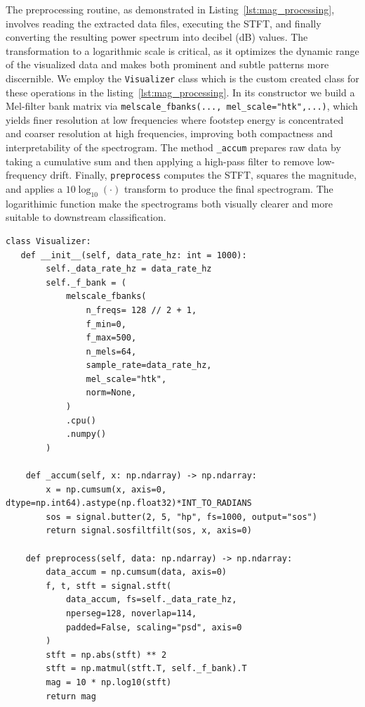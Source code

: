 The preprocessing routine, as demonstrated in Listing~\ref{lst:mag_processing}, involves reading the extracted data files, executing the STFT, and finally converting the resulting power spectrum into decibel (dB) values. The transformation to a logarithmic scale is critical, as it optimizes the dynamic range of the visualized data and makes both prominent and subtle patterns more discernible. We employ the \texttt{Visualizer} class which is the custom created class for these operations in the listing~\ref{lst:mag_processing}. In its constructor we build a Mel-filter bank matrix via \texttt{melscale\_fbanks(...,~mel\_scale="htk",...)}, which yields finer resolution at low frequencies where footstep energy is concentrated and coarser resolution at high frequencies, improving both compactness and interpretability of the spectrogram. The method \texttt{\_accum} prepares raw data by taking a cumulative sum and then applying a high-pass filter to remove low-frequency drift. Finally, \texttt{preprocess} computes the STFT, squares the magnitude, and applies a $10\log_{10}(\cdot)$ transform to produce the final spectrogram. The logarithimic function make the spectrograms both visually clearer and more suitable to downstream classification. 

\begin{lstlisting}[style=pythonstyle, caption={Core processing for converting raw phase data to magnitude output}, label=lst:mag_processing]
class Visualizer:
   def __init__(self, data_rate_hz: int = 1000):
        self._data_rate_hz = data_rate_hz
        self._f_bank = (
            melscale_fbanks(
                n_freqs= 128 // 2 + 1,
                f_min=0,
                f_max=500,
                n_mels=64,
                sample_rate=data_rate_hz,
                mel_scale="htk",
                norm=None,
            )
            .cpu()
            .numpy()
        )

    def _accum(self, x: np.ndarray) -> np.ndarray:
        x = np.cumsum(x, axis=0, dtype=np.int64).astype(np.float32)*INT_TO_RADIANS
        sos = signal.butter(2, 5, "hp", fs=1000, output="sos")
        return signal.sosfiltfilt(sos, x, axis=0)

    def preprocess(self, data: np.ndarray) -> np.ndarray:
        data_accum = np.cumsum(data, axis=0)
        f, t, stft = signal.stft(
            data_accum, fs=self._data_rate_hz,
            nperseg=128, noverlap=114,
            padded=False, scaling="psd", axis=0
        )
        stft = np.abs(stft) ** 2
        stft = np.matmul(stft.T, self._f_bank).T
        mag = 10 * np.log10(stft)
        return mag
\end{lstlisting}

